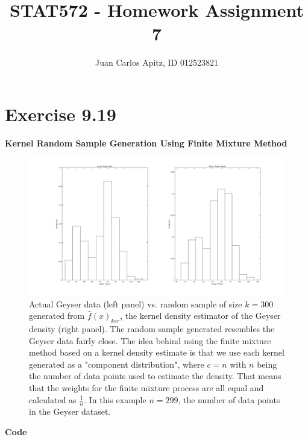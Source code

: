 \documentclass[12pt,a4paper]{article}
\author{Juan Carlos Apitz, ID 012523821}
\title{STAT572 - Homework Assignment 7}
\begin{document}
\maketitle

\section*{Exercise 9.19}
\textbf{Kernel Random Sample Generation Using Finite Mixture Method}
\begin{figure}[ht!] 
\begin{center}
\includegraphics[scale=.35]{q9p19_graph1.png}
\caption{Actual Geyser data (left panel) vs. random sample of size $k=300$ generated from $\hat{f}(x)_{ker}$, the kernel density estimator of the Geyser density (right panel). The random sample generated resembles the Geyser data fairly close. The idea behind using the finite mixture method based on a kernel density estimate is that we use each kernel generated as a "component distribution", where $c=n$ with $n$ being the number of data points used to estimate the density. That means that the weights for the finite mixture process are all equal and calculated as $\frac{1}{n}$. In this example $n=299$, the number of data points in the Geyser dataset.}
\label{q19 fig1}
\end{center}
\end{figure}
\FloatBarrier
\textbf{Code}
\end{document}
